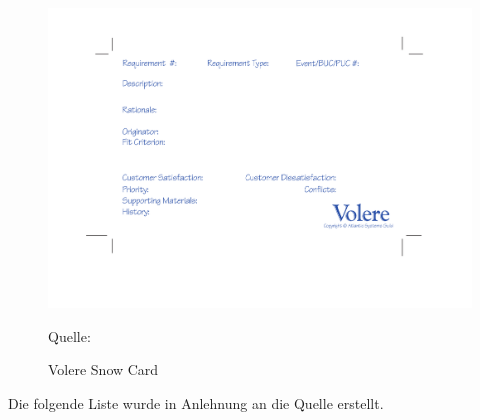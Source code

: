 \begin{figure}[H]
	\centering
	\includegraphics[scale=0.6]{img/snowcard.pdf}
	\caption{Volere Snow Card}
	{\footnotesize Quelle: \cite{VolereSnowCard}}
	\label{abb:volereSnowCard}
\end{figure}

Die folgende Liste wurde in Anlehnung an die Quelle \cite{VolereRequirmentsSpecTemplate} erstellt.

